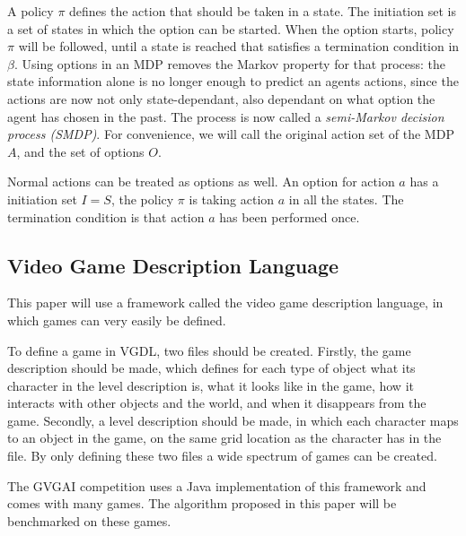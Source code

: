 A policy $\pi$ defines the action that should be taken in a state. The
initiation set is a set of states in which the option can be started. When the
option starts, policy $\pi$ will be followed, until a state is reached that
satisfies a termination condition in $\beta$. Using options in an MDP removes
the Markov property for that process: the state information alone is no longer
enough to predict an agents actions, since the actions are now not only
state-dependant, also dependant on what option the agent has chosen in the past.
The process is now called a \emph{semi-Markov decision process (SMDP)}. For
convenience, we will call the original action set of the MDP $A$, and the set of
options $O$.

Normal actions can be treated as options as well. An option for action $a$ has a
initiation set $I = S$, the policy $\pi$ is taking action $a$ in all the states.
The termination condition is that action $a$ has been performed once.

\subsection{Video Game Description Language}
\label{subsec:vgdl}
This paper will use a framework called the video game description
language\cite{schaul2013video}, in which games can very easily be defined.

To define a game in VGDL, two files should be created. Firstly, the game
description should be made, which defines for each type of object what its
character in the level description is, what it looks like in the game, how it
interacts with other objects and the world, and when it disappears from the
game. Secondly, a level description should be made, in which each character maps
to an object in the game, on the same grid location as the character has in the
file. By only defining these two files a wide spectrum of games can be created.

The GVGAI competition uses a Java implementation of this framework and comes
with many games. The algorithm proposed in this paper will be benchmarked on
these games.
